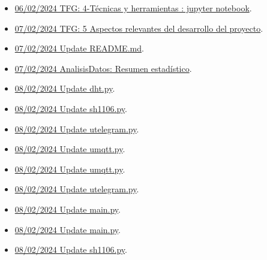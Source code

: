 \begin{itemize}
\item \href{https://github.com/JLCaballeroMQ/Proyecto_TFG_UBU_23_24/tree/92a2a8b8a394094bdccbf261c25a385103e57c2c}{06/02/2024 TFG: 4-Técnicas y herramientas : jupyter notebook}.
\item \href{https://github.com/JLCaballeroMQ/Proyecto_TFG_UBU_23_24/tree/6d9fe893c8faed0ad1d9eda621badbbd5e40c619}{07/02/2024 TFG: 5 Aspectos relevantes del desarrollo del proyecto}.
\item \href{https://github.com/JLCaballeroMQ/Proyecto_TFG_UBU_23_24/tree/59b399f6316ab8a67d47937cf3ec2ba75d205092}{07/02/2024 Update README.md}.
\item \href{https://github.com/JLCaballeroMQ/Proyecto_TFG_UBU_23_24/tree/e423cdba23803c73d5cf24bc04545f8dd7a46418}{07/02/2024 AnalisisDatos: Resumen estadístico}.
\item \href{https://github.com/JLCaballeroMQ/Proyecto_TFG_UBU_23_24/tree/bafa8fa524f9236d47d29480f552251ab508b6e8}{08/02/2024 Update dht.py}.
\item \href{https://github.com/JLCaballeroMQ/Proyecto_TFG_UBU_23_24/tree/cf44e1d1e7ecbe93e2d2bf26acac8a691530dd3b}{08/02/2024 Update sh1106.py}.
\item \href{https://github.com/JLCaballeroMQ/Proyecto_TFG_UBU_23_24/tree/f739933320fc59430ae87bd7a01b4e6bb944b0e9}{08/02/2024 Update utelegram.py}.
\item \href{https://github.com/JLCaballeroMQ/Proyecto_TFG_UBU_23_24/tree/4145c6dd945feebaadbdc8fe36c81ca2cdf716b6}{08/02/2024 Update umqtt.py}.
\item \href{https://github.com/JLCaballeroMQ/Proyecto_TFG_UBU_23_24/tree/e054483ddf254a878d44cd098da67a91278f699c}{08/02/2024 Update umqtt.py}.
\item \href{https://github.com/JLCaballeroMQ/Proyecto_TFG_UBU_23_24/tree/18c90f96fa599b11f09e1a0d49f8b0f159990f91}{08/02/2024 Update utelegram.py}.
\item \href{https://github.com/JLCaballeroMQ/Proyecto_TFG_UBU_23_24/tree/eadd11e13dc0c8a9c0f3cd9c956c2d2a6cec9198}{08/02/2024 Update main.py}.
\item \href{https://github.com/JLCaballeroMQ/Proyecto_TFG_UBU_23_24/tree/a3756f2deb93d9ae8fb8423bda82bf193dda4538}{08/02/2024 Update main.py}.
\item \href{https://github.com/JLCaballeroMQ/Proyecto_TFG_UBU_23_24/tree/f64a06df55e4d28011789bb739fc94e4f9c69232}{08/02/2024 Update sh1106.py}.

\end{itemize}

